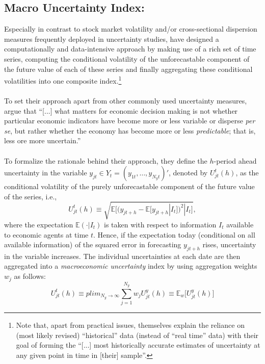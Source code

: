 \documentclass[a4paper,12pt,oneside,pointednumbers,bibtotoc,bigheadings,liststotoc]{scrbook}
\begin{document}
\subsection{Macro Uncertainty Index: \citet{juradoetal:15}}
\label{sec:macrouncertainty}
Especially in contrast to stock market volatility and/or cross-sectional dispersion measures frequently deployed in uncertainty studies, \citet{juradoetal:15} have designed a computationally and data-intensive approach by making use of a rich set of time series, computing the conditional volatility of the unforecastable component of the future value of each of these series and finally aggregating these conditional volatilities into one composite index.\footnote{Note that, apart from practical issues, \citet[p. 1191]{juradoetal:15} themselves explain the reliance on (most likely revised) ``historical'' data (instead of ``real time'' data) with their goal of forming the ``[...] most historically accurate estimates of uncertainty at any given point in time in [their] sample''.}\\
\\
To set their approach apart from other commonly used uncertainty measures, \citet[p. 1178]{juradoetal:15} argue that ``[...] what matters for economic decision making is not whether particular economic indicators have become more or less variable or disperse \textit{per se}, but rather whether the economy has become more or less \textit{predictable}; that is, less ore more uncertain.''\\
\\
To formalize the rationale behind their approach, they define the $h$-period ahead uncertainty in the variable $y_{jt} \in Y_t = (y_{1t}, \ldots, y_{N_{y}t})'$, denoted by $U^t_{jt}(h)$, as the conditional volatility of the purely unforecastable component of the future value of the series, i.e.,
\begin{equation} \label{eq:juradoetal_1}
U^t_{jt}(h) \equiv \sqrt{\mathbb{E}\Big[(y_{jt+h} - \mathbb{E}[y_{jt+h}|I_t])^2|I_t\Big]},
\end{equation}
where the expectation $\mathbb{E}(\cdot|I_t)$ is taken with respect to information $I_t$ available to economic agents at time $t$. Hence, if the expectation today (conditional on all available information) of the squared error in forecasting $y_{jt+h}$ rises, uncertainty in the variable increases. The individual uncertainties at each date are then aggregated into a \textit{macroeconomic uncertainty} index by using aggregation weights $w_j$ as follows:
\begin{equation} \label{eq:juradoetal_2}
U^t_{jt}(h) \equiv plim_{N_{y}\to\infty} \sum_{j=1}^{N_y} w_j U_{jt}^y(h) \equiv \mathbb{E}_w \Big[U_{jt}^y(h)\Big]
\end{equation}
\end{document}
